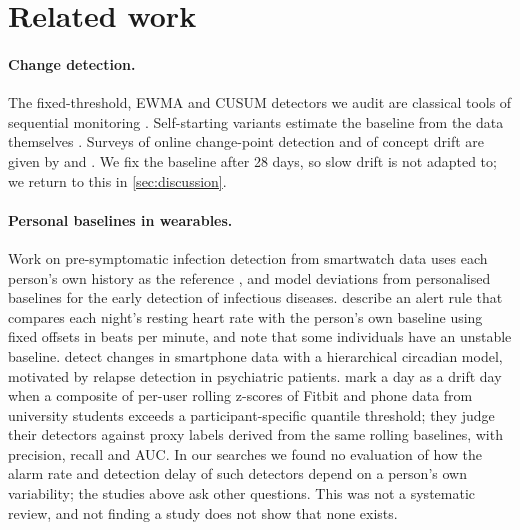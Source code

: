 \documentclass[11pt,a4paper]{article}
\begin{document}
\section{Related work}
\paragraph{Change detection.}
The fixed-threshold, EWMA and CUSUM detectors we audit are classical tools of sequential monitoring \citep{page1954,roberts1959}. Self-starting variants estimate the baseline from the data themselves \citep{hawkins1987}. Surveys of online change-point detection and of concept drift are given by \citet{aminikhanghahi2017} and \citet{gama2014}. We fix the baseline after 28 days, so slow drift is not adapted to; we return to this in \cref{sec:discussion}.

\paragraph{Personal baselines in wearables.}
Work on pre-symptomatic infection detection from smartwatch data uses each person's own history as the reference \citep{mishra2020,alavi2022}, and \citet{cacheda2026} model deviations from personalised baselines for the early detection of infectious diseases.
\citet{alavi2022} describe an alert rule that compares each night's resting heart rate with the person's own baseline using fixed offsets in beats per minute, and note that some individuals have an unstable baseline.
\citet{morenomunoz2018} detect changes in smartphone data with a hierarchical circadian model, motivated by relapse detection in psychiatric patients.
\citet{tolosa2026} mark a day as a drift day when a composite of per-user rolling z-scores of Fitbit and phone data from university students exceeds a participant-specific quantile threshold; they judge their detectors against proxy labels derived from the same rolling baselines, with precision, recall and AUC.
In our searches we found no evaluation of how the alarm rate and detection delay of such detectors depend on a person's own variability; the studies above ask other questions. This was not a systematic review, and not finding a study does not show that none exists.
\end{document}
